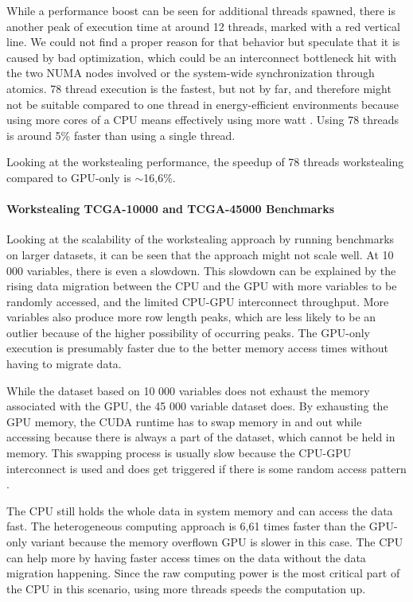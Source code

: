 While a performance boost can be seen for additional threads spawned, there is another peak of execution time at around 12 threads, marked with a red vertical line. We could not find a proper reason for that behavior but speculate that it is caused by bad optimization, which could be an interconnect bottleneck hit with the two NUMA nodes involved or the system-wide synchronization through atomics. 78 thread execution is the fastest, but not by far, and therefore might not be suitable compared to one thread in energy-efficient environments because using more cores of a CPU means effectively using more watt \cite{saravananStudyFactorsInfluencing2011}. Using 78 threads is around 5\% faster than using a single thread.

Looking at the workstealing performance, the speedup of 78 threads workstealing compared to GPU-only is $\sim$16,6\%.

\paragraph{Workstealing TCGA-10000 and TCGA-45000 Benchmarks}


Looking at the scalability of the workstealing approach by running benchmarks on larger datasets, it can be seen that the approach might not scale well. At 10 000 variables, there is even a slowdown. This slowdown can be explained by the rising data migration between the CPU and the GPU with more variables to be randomly accessed, and the limited CPU-GPU interconnect throughput. More variables also produce more row length peaks, which are less likely to be an outlier because of the higher possibility of occurring peaks.
The GPU-only execution is presumably faster due to the better memory access times without having to migrate data.

While the dataset based on 10 000 variables does not exhaust the memory associated with the GPU, the 45 000 variable dataset does. By exhausting the GPU memory, the CUDA runtime has to swap memory in and out while accessing because there is always a part of the dataset, which cannot be held in memory. This swapping process is usually slow because the CPU-GPU interconnect is used and does get triggered if there is some random access pattern \cite{gangulyAdaptivePageMigration2020, kimBatchAwareUnifiedMemory2020}.

The CPU still holds the whole data in system memory and can access the data fast. The heterogeneous computing approach is 6,61 times faster than the GPU-only variant because the memory overflown GPU is slower in this case. The CPU can help more by having faster access times on the data without the data migration happening.
Since the raw computing power is the most critical part of the CPU in this scenario, using more threads speeds the computation up.

